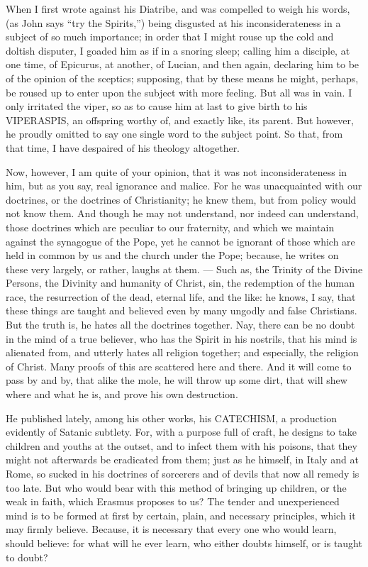 When I first wrote against his Diatribe, and was compelled to weigh his words, (as John says “try the Spirits,”) being disgusted at his inconsiderateness in a subject of so much importance; in order that I might rouse up the cold and doltish disputer, I goaded him as if in a snoring sleep; calling him a disciple, at one time, of Epicurus, at another, of Lucian, and then again, declaring him to be of the opinion of the sceptics; supposing, that by these means he might, perhaps, be roused up to enter upon the subject with more feeling. But all was in vain. I only irritated the viper, so as to cause him at last to give birth to his \textsc{VIPERASPIS}, an offspring worthy of, and exactly like, its parent. But however, he proudly omitted to say one single word to the subject point. So that, from that time, I have despaired of his theology altogether.

Now, however, I am quite of your opinion, that it was not inconsiderateness in him, but as you say, real ignorance and malice. For he was unacquainted with our doctrines, or the doctrines of Christianity; he knew them, but from policy would not know them. And though he may not understand, nor indeed can understand, those doctrines which are peculiar to our fraternity, and which we maintain against the synagogue of the Pope, yet he cannot be ignorant of those which are held in common by us and the church under the Pope; because, he writes on these very largely, or rather, laughs at them. — Such as, the Trinity of the Divine Persons, the Divinity and humanity of Christ, sin, the redemption of the human race, the resurrection of the dead, eternal life, and the like: he knows, I say, that these things are taught and believed even by many ungodly and false Christians. But the truth is, he hates all the doctrines together. Nay, there can be no doubt in the mind of a true believer, who has the Spirit in his nostrils, that his mind is alienated from, and utterly hates all religion together; and especially, the religion of Christ. Many proofs of this are scattered here and there. And it will come to pass by and by, that alike the mole, he will throw up some dirt, that will shew where and what he is, and prove his own destruction.

He published lately, among his other works, his \textsc{CATECHISM}, a production evidently of Satanic subtlety. For, with a purpose full of craft, he designs to take children and youths at the outset, and to infect them with his poisons, that they might not afterwards be eradicated from them; just as he himself, in Italy and at Rome, so sucked in his doctrines of sorcerers and of devils that now all remedy is too late. But who would bear with this method of bringing up children, or the weak in faith, which Erasmus proposes to us? The tender and unexperienced mind is to be formed at first by certain, plain, and necessary principles, which it may firmly believe. Because, it is necessary that every one who would learn, should believe: for what will he ever learn, who either doubts himself, or is taught to doubt?

